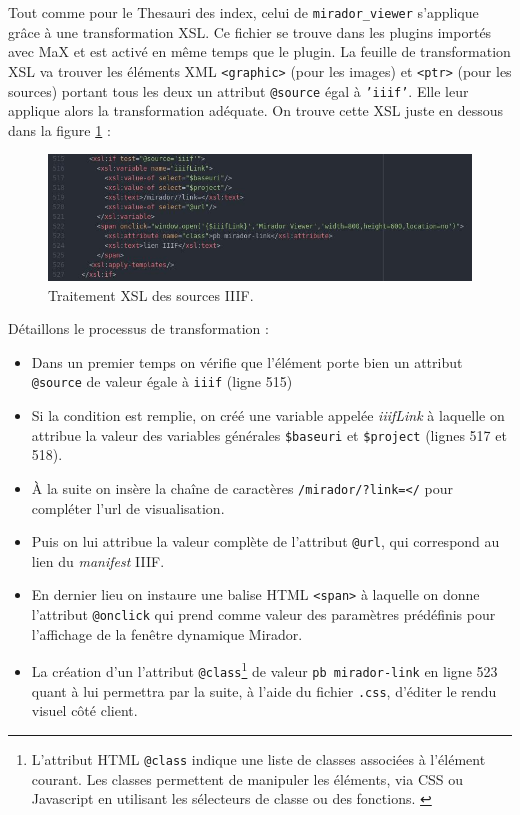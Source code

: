 \documentclass[a4paper,12pt,twoside]{book}
\begin{document}
Tout comme pour le Thesauri des index, celui de \texttt{mirador\_viewer} s'applique grâce à une transformation \acrshort{XSL}. Ce fichier se trouve dans les plugins importés avec MaX et est activé en même temps que le plugin. La feuille de transformation \acrshort{XSL} va trouver les éléments XML \texttt{<graphic>} (pour les images) et \texttt{<ptr>} (pour les sources) portant tous les deux un attribut \texttt{@source} égal à \texttt{'iiif'}. Elle leur applique alors la transformation adéquate. On trouve cette \acrshort{XSL} juste en dessous dans la figure \ref{xsl:_mirador} :


\begin{figure}[H]
    \centering
    \includegraphics[width=15cm]{img/partie_3/xsl_mirador.JPG}
    \caption{Traitement \acrshort{XSL} des sources \acrshort{IIIF}.}
    \label{xsl:_mirador}
\end{figure}

Détaillons le processus de transformation :
\begin{itemize}
    \item Dans un premier temps on vérifie que l'élément porte bien un attribut \texttt{@source} de valeur égale à \texttt{iiif} (ligne 515)
    \item Si la condition est remplie, on créé une variable appelée \textit{iiifLink} à laquelle on attribue la valeur des variables générales \texttt{\$baseuri} et \texttt{\$project} (lignes 517 et 518).
    \item À la suite on insère la chaîne de caractères \texttt{/mirador/?link=</} pour compléter l'url de visualisation.
    \item Puis on lui attribue la valeur complète de l'attribut \texttt{@url}, qui correspond au lien du \textit{manifest} \acrshort{IIIF}.
    \item En dernier lieu on instaure une balise \acrshort{HTML} \texttt{<span>} à laquelle on donne l'attribut \texttt{@onclick} qui prend comme valeur des paramètres prédéfinis pour l'affichage de la fenêtre dynamique Mirador.
    \item La création d'un l'attribut \texttt{@class}\footnote{L'attribut HTML \texttt{@class} indique une liste de classes associées à l'élément courant. Les classes permettent de manipuler les éléments, via \acrshort{CSS} ou Javascript en utilisant les sélecteurs de classe ou des fonctions. \cite{class}} de valeur \texttt{pb mirador-link} en ligne 523 quant à lui permettra par la suite, à l'aide du fichier \texttt{.css}, d'éditer le rendu visuel côté client.
\end{itemize}
\end{document}
